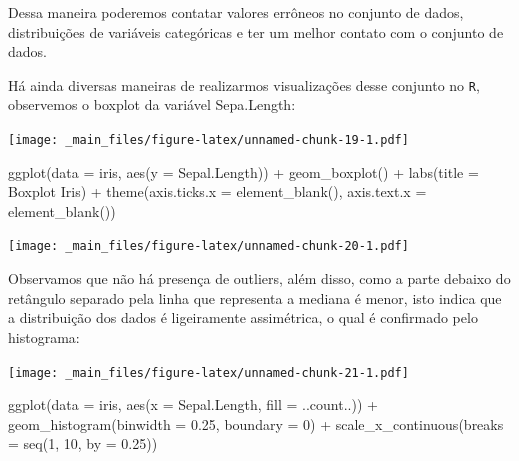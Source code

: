 \documentclass[
]{book}
\newenvironment{Shaded}{\begin{snugshade}}{\end{snugshade}}
\newcommand{\AttributeTok}[1]{\textcolor[rgb]{0.77,0.63,0.00}{#1}}
\newcommand{\DecValTok}[1]{\textcolor[rgb]{0.00,0.00,0.81}{#1}}
\newcommand{\FloatTok}[1]{\textcolor[rgb]{0.00,0.00,0.81}{#1}}
\newcommand{\FunctionTok}[1]{\textcolor[rgb]{0.00,0.00,0.00}{#1}}
\newcommand{\NormalTok}[1]{#1}
\newcommand{\SpecialCharTok}[1]{\textcolor[rgb]{0.00,0.00,0.00}{#1}}
\newcommand{\StringTok}[1]{\textcolor[rgb]{0.31,0.60,0.02}{#1}}
\begin{document}
Dessa maneira poderemos contatar valores errôneos no conjunto de dados, distribuições de variáveis categóricas e ter um melhor contato com o conjunto de dados.

Há ainda diversas maneiras de realizarmos visualizações desse conjunto no \texttt{R}, observemos o boxplot da variável Sepa.Length:

\begin{Shaded}
\end{Shaded}

\texttt{[image: \_main\_files/figure-latex/unnamed-chunk-19-1.pdf]}

\begin{Shaded}
\begin{Highlighting}[]
\FunctionTok{ggplot}\NormalTok{(}\AttributeTok{data =}\NormalTok{ iris, }\FunctionTok{aes}\NormalTok{(}\AttributeTok{y =}\NormalTok{ Sepal.Length)) }\SpecialCharTok{+}
  \FunctionTok{geom\_boxplot}\NormalTok{() }\SpecialCharTok{+}
  \FunctionTok{labs}\NormalTok{(}\AttributeTok{title =} \StringTok{\textquotesingle{}Boxplot Iris\textquotesingle{}}\NormalTok{) }\SpecialCharTok{+}
  \FunctionTok{theme}\NormalTok{(}\AttributeTok{axis.ticks.x =} \FunctionTok{element\_blank}\NormalTok{(),}
  \AttributeTok{axis.text.x =} \FunctionTok{element\_blank}\NormalTok{())}
\end{Highlighting}
\end{Shaded}

\texttt{[image: \_main\_files/figure-latex/unnamed-chunk-20-1.pdf]}

Observamos que não há presença de outliers, além disso, como a parte debaixo do retângulo separado pela linha que representa a mediana é menor, isto indica que a distribuição dos dados é ligeiramente assimétrica, o qual é confirmado pelo histograma:

\begin{Shaded}
\end{Shaded}

\texttt{[image: \_main\_files/figure-latex/unnamed-chunk-21-1.pdf]}

\begin{Shaded}
\begin{Highlighting}[]
\FunctionTok{ggplot}\NormalTok{(}\AttributeTok{data =}\NormalTok{ iris, }\FunctionTok{aes}\NormalTok{(}\AttributeTok{x =}\NormalTok{ Sepal.Length, }\AttributeTok{fill =}\NormalTok{ ..count..)) }\SpecialCharTok{+}
  \FunctionTok{geom\_histogram}\NormalTok{(}\AttributeTok{binwidth =} \FloatTok{0.25}\NormalTok{, }\AttributeTok{boundary =} \DecValTok{0}\NormalTok{) }\SpecialCharTok{+}
  \FunctionTok{scale\_x\_continuous}\NormalTok{(}\AttributeTok{breaks =} \FunctionTok{seq}\NormalTok{(}\DecValTok{1}\NormalTok{, }\DecValTok{10}\NormalTok{, }\AttributeTok{by =} \FloatTok{0.25}\NormalTok{)) }
\end{Highlighting}
\end{Shaded}
\end{document}
